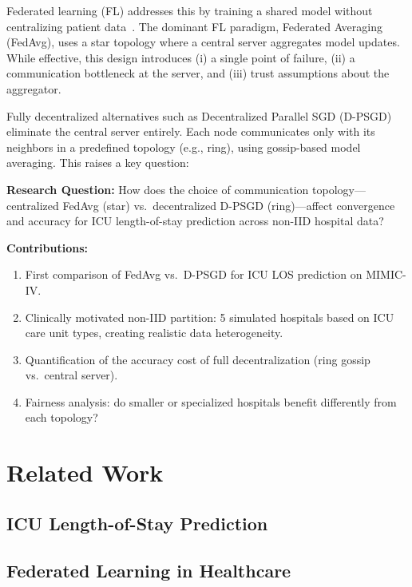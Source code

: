 \documentclass[conference]{IEEEtran}
\begin{document}
Federated learning (FL) addresses this by training a shared model without centralizing patient data~\cite{mcmahan2017communication}. The dominant FL paradigm, Federated Averaging (FedAvg), uses a star topology where a central server aggregates model updates. While effective, this design introduces (i) a single point of failure, (ii) a communication bottleneck at the server, and (iii) trust assumptions about the aggregator.

Fully decentralized alternatives such as Decentralized Parallel SGD (D-PSGD)~\cite{lian2017can} eliminate the central server entirely. Each node communicates only with its neighbors in a predefined topology (e.g., ring), using gossip-based model averaging. This raises a key question:

\textbf{Research Question:} How does the choice of communication topology---centralized FedAvg (star) vs.\ decentralized D-PSGD (ring)---affect convergence and accuracy for ICU length-of-stay prediction across non-IID hospital data?

\textbf{Contributions:}
\begin{enumerate}
    \item First comparison of FedAvg vs.\ D-PSGD for ICU LOS prediction on MIMIC-IV.
    \item Clinically motivated non-IID partition: 5 simulated hospitals based on ICU care unit types, creating realistic data heterogeneity.
    \item Quantification of the accuracy cost of full decentralization (ring gossip vs.\ central server).
    \item Fairness analysis: do smaller or specialized hospitals benefit differently from each topology?
\end{enumerate}


\section{Related Work}
\label{sec:related}

\subsection{ICU Length-of-Stay Prediction}


\subsection{Federated Learning in Healthcare}
\end{document}
